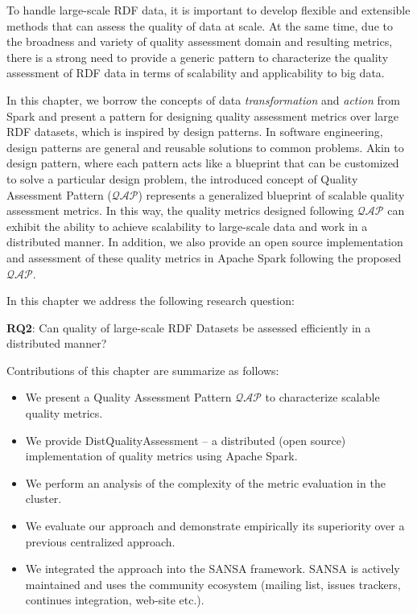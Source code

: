 To handle large-scale \gls{RDF} data, it is important to develop flexible and extensible methods that can assess the quality of data at scale. 
At the same time, due to the broadness and variety of quality assessment domain and resulting metrics, there is a strong need to provide a generic pattern to characterize the quality assessment of \gls{RDF} data in terms of scalability and applicability to big data.

In this chapter, we borrow the concepts of data \textit{transformation} and \textit{action} from Spark and present a 
pattern for designing quality assessment metrics over large \gls{RDF} datasets, which is inspired by design patterns.
In software engineering, design patterns are general and reusable solutions to common problems. 
Akin to design pattern, where each pattern acts like a blueprint that can be customized to solve a particular design problem, 
the introduced concept of Quality Assessment Pattern ($\mathcal{QAP}$) represents a generalized blueprint of scalable quality assessment metrics. 
In this way, the quality metrics designed following $\mathcal{QAP}$ can exhibit the ability to achieve scalability to large-scale data and work in a distributed manner.
In addition, we also provide an open source implementation and assessment of these quality metrics in Apache Spark following the proposed $\mathcal{QAP}$.

In this chapter we address the following research question:

\begin{tcolorbox}
\textbf{RQ2}: Can quality of large-scale \gls{RDF} Datasets be assessed efficiently in a distributed manner?
\end{tcolorbox}

Contributions of this chapter are summarize as follows:
\begin{itemize}
    \item We present a Quality Assessment Pattern $\mathcal{QAP}$ to characterize scalable quality metrics.
    \item We provide DistQualityAssessment -- a distributed (open source) implementation of quality metrics using Apache Spark.
    \item We perform an analysis of the complexity of the metric evaluation in the cluster.
    \item We evaluate our approach and demonstrate empirically its superiority over a previous centralized approach.
    \item We integrated the approach into the SANSA framework.
    SANSA is actively maintained and uses the community ecosystem (mailing list, issues trackers, continues integration, web-site etc.).
\end{itemize}


